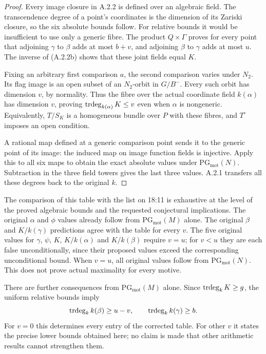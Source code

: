 \begin{proof}
Every image closure in A.2.2 is defined over an algebraic field.
The transcendence degree of a point's coordinates is the dimension
of its Zariski closure, so the six absolute bounds follow. For
relative bounds it would be insufficient to use only a generic
fibre. The product $Q\times\Gamma$ proves for every point that
adjoining $\gamma$ to $\beta$ adds at most $b+v$, and adjoining
$\beta$ to $\gamma$ adds at most $u$. The inverse of (A.2.2b) shows
that these joint fields equal $K$.

Fixing an arbitrary first comparison $a$, the second comparison
varies under $N_2$. Its flag image is an open subset of an
$N_2$-orbit in $G/B^-$. Every such orbit has dimension $v$, by
normality. Thus the fibre over the actual coordinate field
$k(\alpha)$ has dimension $v$, proving
$\operatorname{trdeg}_{k(\alpha)}K\leq v$ even when $\alpha$ is nongeneric.
Equivalently, $T/S_K$ is a homogeneous bundle over $P$ with these
fibres, and $T^\circ$ imposes an open condition.

A rational map defined at a generic comparison point sends it to
the generic point of its image: the induced map on image function
fields is injective. Apply this to all six maps to obtain the exact
absolute values under $\mathrm{PG}_{\mathrm{mot}}(N)$. Subtraction
in the three field towers gives the last three values. A.2.1
transfers all these degrees back to the original $k$.
\end{proof}

The comparison of this table with the list on 18:11 is exhaustive
at the level of the proved algebraic bounds and the requested
conjectural implications. The original $\alpha$ and $\phi$ values
already follow from $\mathrm{PG}_{\mathrm{mot}}(M)$ alone.
The original $\beta$ and $K/k(\gamma)$ predictions agree with the
table for every $v$. The five original values for $\gamma$, $\psi$,
$K$, $K/k(\alpha)$ and $K/k(\beta)$ require $v=u$; for $v<u$
they are each false unconditionally, since their proposed values
exceed the corresponding unconditional bound. When $v=u$, all
original values follow from $\mathrm{PG}_{\mathrm{mot}}(N)$.
This does not prove actual maximality for every motive.

There are further consequences from $\mathrm{PG}_{\mathrm{mot}}(M)$
alone. Since $\operatorname{trdeg}_k K\geq g$, the uniform relative bounds imply
\[
 \operatorname{trdeg}_k k(\beta)\geq u-v,\qquad
 \operatorname{trdeg}_k k(\gamma)\geq b.
\]
For $v=0$ this determines every entry of the corrected table.
For other $v$ it states the precise lower bounds obtained here;
no claim is made that other arithmetic results cannot strengthen
them.

